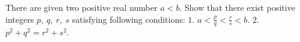 There are given two positive real number $a<b$. Show that there exist positive integers $p, \ q, \ r, \ s$ satisfying following conditions:
$1$. $a< \frac{p}{q} < \frac{r}{s} < b$.
$2.$ $p^2+q^2=r^2+s^2$.